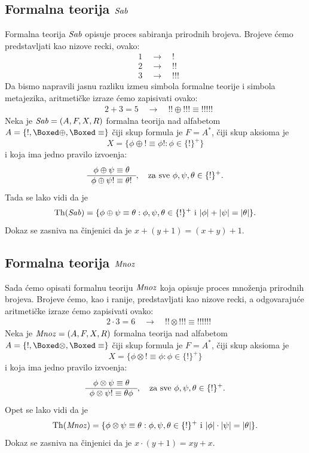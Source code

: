 \subsection{Formalna teorija $\mathit{Sab}$}

Formalna teorija $\mathit{Sab}$ opisuje proces sabiranja prirodnih brojeva. Brojeve \'cemo predstavljati kao nizove recki, ovako:
\begin{align*}
  &1 \quad\to\quad !\\
  &2 \quad\to\quad !!\\
  &3 \quad\to\quad !!!
\end{align*}
Da bismo napravili jasnu razliku izme\dj u simbola formalne teorije i simbola metajezika, aritmeti\v cke izraze \'cemo zapisivati ovako:
\begin{align*}
  &2 + 3 = 5 \quad\to\quad !! \oplus !!! \equiv !!!!!
\end{align*}
Neka je $\mathit{Sab} = (A, F, X, R)$ formalna teorija nad alfabetom $A = \{!, \Boxed\oplus, \Boxed\equiv\}$ \v ciji skup formula
je $F = A^*$, \v ciji skup aksioma je
$$
  X = \{\phi \oplus ! \equiv \phi! : \phi \in \{!\}^+\}
$$
i koja ima jedno pravilo izvo\dj enja:
$$
  \begin{array}{c}
    \phi \oplus \psi \equiv \theta \\ \hline
    \phi \oplus \psi! \equiv \theta!
  \end{array}, \text{\quad za sve } \phi, \psi, \theta \in \{!\}^+.
$$
Tada se lako vidi da je
$$
  \mathrm{Th}(\mathit{Sab}) = \{\phi \oplus \psi \equiv \theta : \phi, \psi, \theta \in \{!\}^+ \text{ i } |\phi| + |\psi| = |\theta|\}.
$$
Dokaz se zasniva na \v cinjenici da je $x + (y + 1) = (x + y) + 1$.

\subsection{Formalna teorija $\mathit{Mnoz}$}

Sada \'cemo opisati formalnu teoriju $\mathit{Mnoz}$ koja opisuje proces mno\v zenja prirodnih brojeva.
Brojeve \'cemo, kao i ranije, predstavljati kao nizove recki, a odgovaraju\'ce aritmeti\v cke izraze \'cemo zapisivati ovako:
\begin{align*}
  &2 \cdot 3 = 6 \quad\to\quad !! \otimes !!! \equiv !!!!!!
\end{align*}
Neka je $\mathit{Mnoz} = (A, F, X, R)$ formalna teorija nad alfabetom $A = \{!, \Boxed\otimes, \Boxed\equiv\}$ \v ciji skup formula je
$F = A^*$, \v ciji skup aksioma je
$$
  X = \{\phi \otimes ! \equiv \phi : \phi \in \{!\}^+\}
$$
i koja ima jedno pravilo izvo\dj enja:
$$
  \begin{array}{c}
    \phi \otimes \psi \equiv \theta \\ \hline
    \phi \otimes \psi! \equiv \theta\phi
  \end{array}, \text{\quad za sve } \phi, \psi, \theta \in \{!\}^+.
$$
Opet se lako vidi da je
$$
  \mathrm{Th}(\mathit{Mnoz}) = \{\phi \otimes \psi \equiv \theta : \phi, \psi, \theta \in \{!\}^+ \text{ i } |\phi| \cdot |\psi| = |\theta|\}.
$$
Dokaz se zasniva na \v cinjenici da je $x \cdot (y + 1) = xy + x$.


